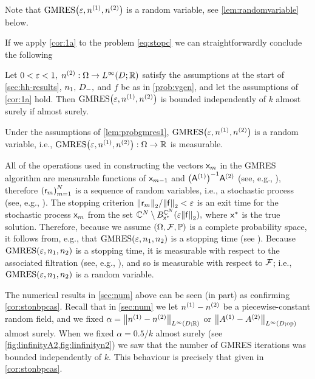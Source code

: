Note that $\GMRES{\eps}{\nso}{\nst}$ is a random variable, see \cref{lem:randomvariable} below.

If we apply \cref{cor:1a} to the problem \cref{eq:stopc} we can straightforwardly conclude the following 

\label{cor:stonbpcas}
Let $0 < \varepsilon < 1,$ $\nst:\Omega \rightarrow \LiDRR$ satisfy the assumptions at the start of \cref{sec:hh-results}, $n_{1}, \,D_{-},$ and $f$ be as in \cref{prob:vgen}, and let the assumptions of \cref{cor:1a} hold. Then $\GMRES{\eps}{\nso}{\nst}$ is bounded independently of $k$ almost surely if
\beq\label{eq:nbpcas}
\NLiDRR{\nso-\nst(\omega)} \leq {}
\eeq
almost surely.
\eco


\label{lem:randomvariable}
Under the assumptions of \cref{lem:probgmres1}, $\GMRES{\eps}{\nso}{\nst}$ is a random variable, i.e., $\GMRES{\eps}{\nso}{\nst}:\Omega\rightarrow \RR$ is measurable.
\ele

All of the operations used in constructing the vectors $\mathsf{x}_{m}$ in the GMRES algorithm are measurable functions of $\mathsf{x}_{m-1}$ and $\AmatoI\Amatt$ (see, e.g., \cite[Algorithms 11.4.2 and 5.1.3]{GoVa:13}), therefore $\mleft(\rvecm\mright)_{m=1}^N$ is a sequence of random variables, i.e., a stochastic process (see, e.g., \cite[Definition 2.1.4]{Ok:13}). The stopping criterion $\Nt{\rvecm}/\Nt{\fvec} < \eps$ is an exit time for the stochastic process $\mathsf{x}_{m}$ from the set $\CCN \setminus \ball{\CCN}{\xvecs}{\eps\Nt{\fvec}},$ where $\mathsf{x}^{*}$ is the true solution. Therefore, because we assume $\OFP$ is a complete probability space, it follows from, e.g.,  \cite[Example 7.2.2]{Ok:13} that $\GMRES{\eps}{\no}{\nt}$ is a stopping time (see \cite[Definition 7.2.1]{Ok:13}). Because $\GMRES{\eps}{\no}{\nt}$ is a stopping time, it is measurable with respect to the associated filtration (see, e.g., \cite[Definition 3.2.2]{Ok:13}), and so is measurable with respect to $\mathcal F$; i.e., $\GMRES{\eps}{\no}{\nt}$ is a random variable.
\epf

The numerical results in \cref{sec:num} above can be seen (in part) as confirming \cref{cor:stonbpcas}. Recall that in \cref{sec:num} we let ${n}^{(1)}-{n}^{(2)}$ be a piecewise-constant random field, and we fixed $\alpha = \NLiDRR{\nso-\nst}$ or $\NLiDRRdtd{\Aso-\Ast}$ almost surely. When we fixed $\alpha = 0.5/k$ almost surely (see \cref{fig:linfinityA2,fig:linfinityn2}) we saw that the number of GMRES iterations was bounded independently of $k.$ This behaviour is precisely that given in \cref{cor:stonbpcas}.

